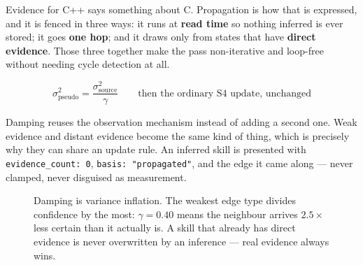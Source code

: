 \documentclass[11pt,a4paper]{article}
\newenvironment{keyeq}{%
  \begin{shaded}
  \centering
}{%
  \end{shaded}
}
\begin{document}
Evidence for C++ says something about C. Propagation is how that is
expressed, and it is fenced in three ways: it runs at \textbf{read time} so
nothing inferred is ever stored; it goes \textbf{one hop}; and it draws only
from states that have \textbf{direct evidence}. Those three together make
the pass non-iterative and loop-free without needing cycle detection at
all.

\begin{keyeq}
\[
\sigma^2_{\text{pseudo}} = \frac{\sigma^2_{\text{source}}}{\gamma}
\qquad \text{then the ordinary S4 update, unchanged}
\]
\end{keyeq}

Damping reuses the observation mechanism instead of adding a second one.
Weak evidence and distant evidence become the same kind of thing, which is
precisely why they can share an update rule. An inferred skill is presented
with \texttt{evidence\_count: 0}, \texttt{basis: "propagated"}, and the edge
it came along --- never clamped, never disguised as measurement.

\begin{figure}[H]
\centering
{}
\caption{Damping is variance inflation. The weakest edge type divides
confidence by the most: $\gamma=0.40$ means the neighbour arrives $2.5\times$
less certain than it actually is. A skill that already has direct evidence
is never overwritten by an inference --- real evidence always wins.}
\label{fig:propagation}
\end{figure}
\end{document}
